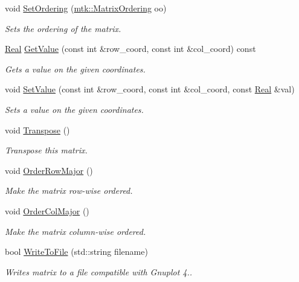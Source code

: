 \begin{DoxyCompactItemize}
void \hyperlink{classmtk_1_1DenseMatrix_aacae136ae446cad8f0d81476e83efb39}{Set\+Ordering} (\hyperlink{group__c02-enums_ga622801bd9f912d0f976c3e383f5f581c}{mtk\+::\+Matrix\+Ordering} oo)
\begin{DoxyCompactList}\small\item\em Sets the ordering of the matrix. \end{DoxyCompactList}\item 
\hyperlink{group__c01-roots_gac080bbbf5cbb5502c9f00405f894857d}{Real} \hyperlink{classmtk_1_1DenseMatrix_a87fb785713c04b13767947cc3325ce7c}{Get\+Value} (const int \&row\+\_\+coord, const int \&col\+\_\+coord) const 
\begin{DoxyCompactList}\small\item\em Gets a value on the given coordinates. \end{DoxyCompactList}\item 
void \hyperlink{classmtk_1_1DenseMatrix_ae0f873a6d3a734da467cafb817da64ae}{Set\+Value} (const int \&row\+\_\+coord, const int \&col\+\_\+coord, const \hyperlink{group__c01-roots_gac080bbbf5cbb5502c9f00405f894857d}{Real} \&val)
\begin{DoxyCompactList}\small\item\em Sets a value on the given coordinates. \end{DoxyCompactList}\item 
void \hyperlink{classmtk_1_1DenseMatrix_a71d9c07ca66e88d97d1fd5012f43138b}{Transpose} ()
\begin{DoxyCompactList}\small\item\em Transpose this matrix. \end{DoxyCompactList}\item 
void \hyperlink{classmtk_1_1DenseMatrix_ac2949efba3e8278335d45418c85433e4}{Order\+Row\+Major} ()
\begin{DoxyCompactList}\small\item\em Make the matrix row-\/wise ordered. \end{DoxyCompactList}\item 
void \hyperlink{classmtk_1_1DenseMatrix_a59b9bea24acf39dca64e8549b3527463}{Order\+Col\+Major} ()
\begin{DoxyCompactList}\small\item\em Make the matrix column-\/wise ordered. \end{DoxyCompactList}\item 
bool \hyperlink{classmtk_1_1DenseMatrix_aedead04ae21c5d66428b84da3dac943a}{Write\+To\+File} (std\+::string filename)
\begin{DoxyCompactList}\small\item\em Writes matrix to a file compatible with Gnuplot 4.. \end{DoxyCompactList}\end{DoxyCompactItemize}
